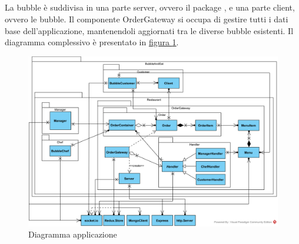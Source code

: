 \subsection{\DemoName}
La bubble \DemoName{} è suddivisa in una parte server, ovvero il package \hyperref[BubbleAndEat::Restaurant::OrderGateway]{}, e una parte client, ovvero le bubble. Il componente OrderGateway si occupa di gestire tutti i dati base dell'applicazione, mantenendoli aggiornati tra le diverse bubble esistenti. Il diagramma complessivo è presentato in \hyperref[fig:bubbleandeat]{figura \ref{fig:bubbleandeat}}.
{}
\begin{landscape}
	\pagestyle{empty}
	\centering
	\begin{figure}
		\centering
		\includegraphics{./diagrammi/demo/bubbleandeat.png}
		\caption{Diagramma applicazione \DemoName{}}\label{fig:bubbleandeat}
	\end{figure}
\end{landscape}
\restoregeometry
\pagestyle{plain}


